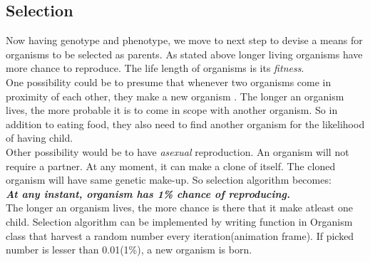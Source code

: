 \documentclass[conference]{IEEEtran}
\begin{document}
\subsection{Selection}
Now having genotype and phenotype, we move to next step to devise a means for organisms to be selected as parents. As stated above longer living organisms have more chance to reproduce. The life length of organisms is its \textit{fitness}.\\
One possibility could be to presume that whenever two organisms come in proximity of each other, they make a new organism \cite{improving-neuroevolution}. The longer an organism lives, the more probable it is to come in scope with another organism. So in addition to eating food, they also need to find another organism for the likelihood of having child.\\
Other possibility would be to have \textit{asexual} reproduction. An organism will not require a partner. At any moment, it can make a clone of itself. The cloned organism will have same genetic make-up. So selection algorithm becomes:\\
\textbf{\textit{At any instant, organism has 1\% chance of reproducing.}}\\
The longer an organism lives, the more chance is there that it make atleast one child. Selection algorithm can be implemented by writing function in Organism class that harvest a random number every iteration(animation frame). If picked number is lesser than 0.01(1\%), a new organism is born.
\end{document}
